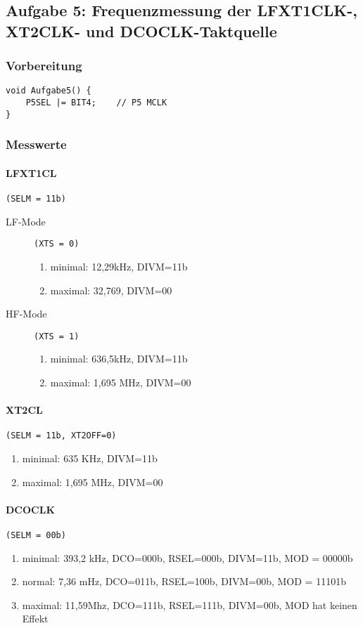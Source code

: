 \subsection*{Aufgabe 5: Frequenzmessung der LFXT1CLK-, XT2CLK- und DCOCLK-Taktquelle}

\subsubsection*{Vorbereitung}
\begin{lstlisting}
void Aufgabe5() {
    P5SEL |= BIT4;    // P5 MCLK
}\end{lstlisting}

\subsubsection*{Messwerte}
\paragraph{LFXT1CL} \texttt{(SELM = 11b)}
\begin{description}
    \item [LF-Mode] \texttt{(XTS = 0)}
        \begin{enumerate}
            \item minimal: 12,29kHz, DIVM=11b
            \item maximal: 32,769, DIVM=00
        \end{enumerate}

    \item [HF-Mode] \texttt{(XTS = 1)}
        \begin{enumerate}
            \item minimal: 636,5kHz, DIVM=11b
            \item maximal: 1,695 MHz, DIVM=00
        \end{enumerate}
\end{description}

\paragraph{XT2CL} \texttt{(SELM = 11b, XT2OFF=0)}
\begin{enumerate}
    \item minimal: 635 KHz, DIVM=11b
    \item maximal: 1,695 MHz, DIVM=00
\end{enumerate}

\paragraph{DCOCLK} \texttt{(SELM = 00b)}
\begin{enumerate}
    \item minimal: 393,2 kHz, DCO=000b, RSEL=000b, DIVM=11b, MOD = 00000b
    \item normal: 7,36 mHz, DCO=011b, RSEL=100b, DIVM=00b, MOD = 11101b
    \item maximal: 11,59Mhz, DCO=111b, RSEL=111b, DIVM=00b, MOD hat keinen Effekt
\end{enumerate}

